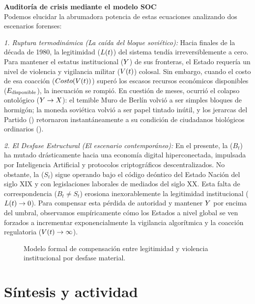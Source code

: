 \begin{ejemplo}
\textbf{Auditoría de crisis mediante el modelo SOC}\\
Podemos elucidar la abrumadora potencia de estas ecuaciones analizando dos escenarios forenses:

\textit{1. Ruptura termodinámica (La caída del bloque soviético):} Hacia finales de la década de 1980, la legitimidad ($L(t)$) del sistema tendía irreversiblemente a cero. Para mantener el estatus institucional ($Y$) de sus fronteras, el Estado requería un nivel de violencia y vigilancia militar ($V(t)$) colosal. Sin embargo, cuando el costo de esa coacción ($Costo(V(t))$) superó los escasos recursos económicos disponibles ($E_{\text{disponible}}$), la inecuación se rompió. En cuestión de meses, ocurrió el colapso ontológico ($Y \to X$): el temible Muro de Berlín volvió a ser simples bloques de hormigón; la moneda soviética volvió a ser papel tintado inútil, y los jerarcas del Partido (\FuncionEstatus) retornaron instantáneamente a su condición de ciudadanos biológicos ordinarios (\HechosBrutos).

\textit{2. El Desfase Estructural (El escenario contemporáneo):} En el presente, la \BaseMaterial{} ($B_t$) ha mutado drásticamente hacia una economía digital hiperconectada, impulsada por Inteligencia Artificial y protocolos criptográficos descentralizados. No obstante, la \Superestructura{} ($S_t$) sigue operando bajo el código deóntico del Estado Nación del siglo XIX y con legislaciones laborales de mediados del siglo XX. Esta falta de correspondencia ($B_t \neq S_t$) erosiona inexorablemente la legitimidad institucional ($L(t) \to 0$). Para compensar esta pérdida de autoridad y mantener $Y$ por encima del umbral, observamos empíricamente cómo los Estados a nivel global se ven forzados a incrementar exponencialmente la vigilancia algorítmica y la coacción regulatoria ($V(t) \to \infty$).
\end{ejemplo}

\begin{figure}[htbp]
    \centering
    
    \caption{Modelo formal de compensación entre legitimidad y violencia institucional por desfase material.}
    \label{fig:termodinamica_poder}
\end{figure}

\section{Síntesis y actividad}

